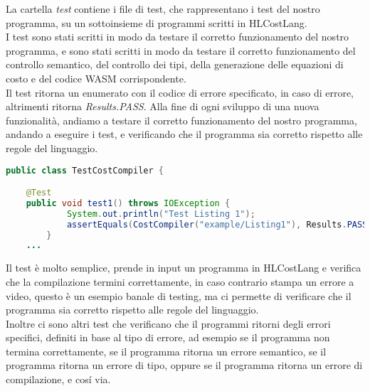 \documentclass[../../main.tex]{subfiles}
\begin{document}
La cartella \textit{test} contiene i file di test, che rappresentano i test del nostro programma, su un sottoinsieme di programmi scritti in HLCostLang.\\
I test sono stati scritti in modo da testare il corretto funzionamento del nostro programma, e sono stati scritti in modo da testare il corretto funzionamento del controllo semantico, del controllo dei tipi, della generazione delle equazioni di costo e del codice WASM corrispondente.\\
Il test ritorna un enumerato con il codice di errore specificato, in caso di errore, altrimenti ritorna \textit{Results.PASS}.
Alla fine di ogni sviluppo di una nuova funzionalità, andiamo a testare il corretto funzionamento del nostro programma, andando a eseguire i test, e verificando che il programma sia corretto rispetto alle regole del linguaggio.\\
\begin{lstlisting}[language=Java, caption={Esempio Testing}]
public class TestCostCompiler {

    @Test
    public void test1() throws IOException {
            System.out.println("Test Listing 1");
            assertEquals(CostCompiler("example/Listing1"), Results.PASS);
        }
    ...
\end{lstlisting} 
Il test è molto semplice, prende in input un programma in HLCostLang e verifica che la compilazione termini correttamente, in caso contrario stampa un errore a video, questo è un esempio banale di testing, ma ci permette di verificare che il programma sia corretto rispetto alle regole del linguaggio.\\
Inoltre ci sono altri test che verificano che il programmi ritorni degli errori specifici, definiti in base al tipo di errore, ad esempio se il programma non termina correttamente, se il programma ritorna un errore semantico, se il programma ritorna un errore di tipo, oppure se il programma ritorna un errore di compilazione, e cosí via.\\
\end{document}

